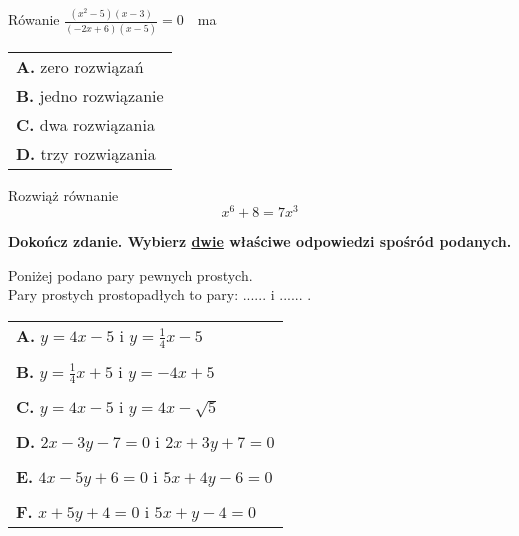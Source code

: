 \documentclass[12pt,a4paper]{article}
\theoremstyle{break}
\begin{document}
	Rówanie \large$\frac{(x^2-5)(x-3)}{(-2x+6)(x-5)}$$=0\quad$\normalsize ma 
	
	\vspace{0.5cm}
	\begin{tabular}{p{14cm}}
		\textbf{A. }zero rozwiązań\\
		\textbf{B. }jedno rozwiązanie\\
		\textbf{C. }dwa rozwiązania\\
		\textbf{D. }trzy rozwiązania\\
	\end{tabular}

	
	\begin{zad}[0-3]
		Rozwiąż równanie
		$$x^6+8=7x^3$$
	\end{zad} 

	\begin{zad}[0-2]
		\textbf{Dokończ zdanie. Wybierz \underline{dwie} właściwe odpowiedzi spośród podanych.}
	\end{zad} 

	Poniżej podano pary pewnych prostych.
	\\
	
	Pary prostych prostopadłych to pary: ...... i ...... .
	
	\vspace{0.5cm}
	\begin{tabular}{p{14cm}}
		\textbf{A. }$y=4x-5$ i $y=\frac{1}{4}x-5$\\
		\\
		\textbf{B. }$y=\frac{1}{4}x+5$ i $y=-4x+5$\\
		\\
		\textbf{C. }$y=4x-5$ i $y=4x-\sqrt{5}$\\
		\\
		\textbf{D. }$2x-3y-7=0$ i $2x+3y+7=0$\\
		\\
		\textbf{E. }$4x-5y+6=0$ i $5x+4y-6=0$\\
		\\
		\textbf{F. }$x+5y+4=0$ i $5x+y-4=0$\\
	\end{tabular}
		

	
\end{document}
